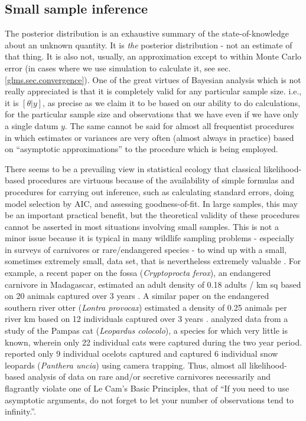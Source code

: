 \subsection{Small sample inference}

The posterior
distribution is an exhaustive summary of the state-of-knowledge
about an unknown quantity. It is {\it the} posterior distribution - not an
estimate of that thing. It is also not, usually, an approximation
except to within Monte Carlo error (in cases where we use simulation
to calculate it, see sec. \ref{glms.sec.convergence}).  One of the great virtues of Bayesian analysis which
is not really appreciated is that it is completely valid for any
particular sample size. i.e., it is $[\theta|y]$, as precise as we
claim it to be based on our ability to do calculations, for the
particular sample size and observations that we have even if we have
only a single datum $y$.  The same cannot be said for almost all
frequentist procedures in which estimates or variances are very often
(almost always in practice) based on ``asymptotic approximations'' to
the procedure which is  being employed.

There seems to be a prevailing view in statistical ecology that
classical likelihood-based procedures are virtuous because of the
availability of simple formulas and procedures for carrying out
inference, such as calculating standard errors, doing model selection
by AIC, and assessing goodness-of-fit.  In large samples, this may be
an important practical benefit, but the theoretical validity of these
procedures cannot be asserted in most situations involving small
samples.  This is not a minor issue because it is typical in many
wildlife sampling problems - especially in surveys of carnivores or
rare/endangered species - to wind up with a small, sometimes extremely
small, data set, that is nevertheless extremely valuable \citep{foster_harmsen:2012}. For example, a recent paper on the fossa
(\emph{Cryptoprocta ferox}), an endangered carnivore in Madagascar, estimated
an adult density of 0.18 adults / km sq based on 20 animals captured
over 3 years \citep{hawkins_racey:2005}. A similar paper on the
endangered southern river otter (\emph{Lontra provocax}) estimated a density
of 0.25 animals per river km based on 12 individuals captured over 3
years \citep{sepulveda_etal:2007}. \citet{gardner_etal:2010ecol} analyzed
data from a study of the Pampas cat (\emph {Leopardus colocolo}), a species for which very little
is known, wherein only 22 individual cats were captured during the
two year period.  \citet{trolle_kery:2005} reported only 9 individual
ocelots captured and \citet{jackson_etal:2006} captured 6 individual
snow leopards (\emph{Panthera uncia}) using camera trapping. Thus, almost all likelihood-based
analysis of data on rare and/or
secretive carnivores necessarily and flagrantly violate one of Le
Cam's Basic Principles, that of ``If you need to use asymptotic
arguments, do not forget to let your number of observations tend to
infinity.''\citep{lecam:1990}.

